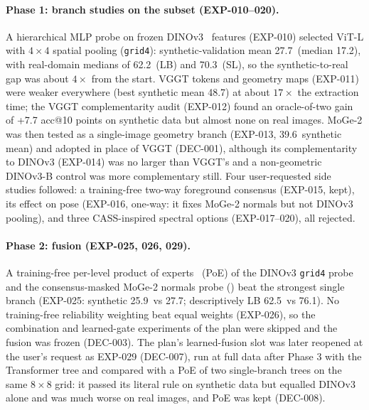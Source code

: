 \paragraph{Phase 1: branch studies on the subset (EXP-010--020).}
A hierarchical MLP probe on frozen DINOv3~\cite{simeoni2025dinov3} features (EXP-010) selected ViT-L with $4\times4$ spatial pooling (\texttt{grid4}): synthetic-validation mean 27.7\appDdeg\ (median 17.2\appDdeg), with real-domain medians of 62.2\appDdeg\ (LB) and 70.3\appDdeg\ (SL), so the synthetic-to-real gap was about $4\times$ from the start. VGGT tokens and geometry maps (EXP-011) were weaker everywhere (best synthetic mean 48.7\appDdeg) at about $17\times$ the extraction time; the VGGT complementarity audit (EXP-012) found an oracle-of-two gain of +7.7 acc@10 points on synthetic data but almost none on real images. MoGe-2 was then tested as a single-image geometry branch (EXP-013, 39.6\appDdeg\ synthetic mean) and adopted in place of VGGT (DEC-001), although its complementarity to DINOv3 (EXP-014) was no larger than VGGT's and a non-geometric DINOv3-B control was more complementary still. Four user-requested side studies followed: a training-free two-way foreground consensus (EXP-015, kept), its effect on pose (EXP-016, one-way: it fixes MoGe-2 normals but not DINOv3 pooling), and three CASS-inspired spectral options (EXP-017--020), all rejected.

\paragraph{Phase 2: fusion (EXP-025, 026, 029).}
A training-free per-level product of experts~\cite{hinton2002poe} (PoE) of the DINOv3 \texttt{grid4} probe and the consensus-masked MoGe-2 normals probe (\appDnormals) beat the strongest single branch (EXP-025: synthetic 25.9\appDdeg\ vs 27.7\appDdeg; descriptively LB 62.5\appDdeg\ vs 76.1\appDdeg). No training-free reliability weighting beat equal weights (EXP-026), so the combination and learned-gate experiments of the plan were skipped and the fusion was frozen (DEC-003). The plan's learned-fusion slot was later reopened at the user's request as EXP-029 (DEC-007), run at full data after Phase 3 with the Transformer tree and compared with a PoE of two single-branch trees on the same $8\times8$ grid: it passed its literal rule on synthetic data but equalled DINOv3 alone and was much worse on real images, and PoE was kept (DEC-008).

